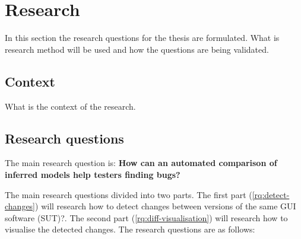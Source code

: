 \section{Research} \label{questions}
    In this section the research questions for the thesis are formulated. What is research method will be used and how the questions are being validated.

    \subsection{Context}
    What is the context of the research. 
    
    
    
\subsection{Research questions}
        
The main research question is: \textbf{How can an automated comparison of inferred models help testers finding bugs?}

The main research questions divided into two parts. The first part (\ref{rq:detect-changes}) will research how to detect changes between versions of the same GUI software (SUT)?\cite{testar-todo}. The second part (\ref{rq:diff-visualisation}) will research how to visualise the detected changes. The research questions are as follows: 

